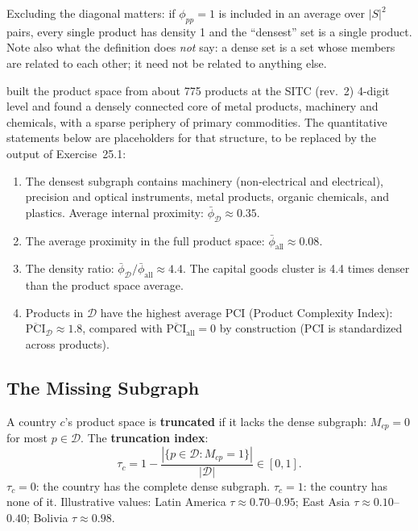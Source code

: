 \documentclass[../structural_economics_book.tex]{subfiles}
\begin{document}
Excluding the diagonal matters: if $\phi_{pp} = 1$ is included in an average over $|S|^2$ pairs, every single product has density 1 and the ``densest'' set is a single product. Note also what the definition does \emph{not} say: a dense set is a set whose members are related to each other; it need not be related to anything else.

\begin{stylizedfact}\label{ch25:prop:capital_goods}
\citet{hidalgo2007product} built the product space from about 775 products at the SITC (rev.~2) 4-digit level and found a densely connected core of metal products, machinery and chemicals, with a sparse periphery of primary commodities. The quantitative statements below are \illustrative{} placeholders for that structure, to be replaced by the output of Exercise~25.1:
\begin{enumerate}
\item The densest subgraph contains machinery (non-electrical and electrical), precision and optical instruments, metal products, organic chemicals, and plastics. Average internal proximity: $\bar{\phi}_{\mathcal{D}} \approx 0.35$.
\item The average proximity in the full product space: $\bar{\phi}_{\text{all}} \approx 0.08$.
\item The density ratio: $\bar{\phi}_{\mathcal{D}} / \bar{\phi}_{\text{all}} \approx 4.4$. The capital goods cluster is 4.4 times denser than the product space average.
\item Products in $\mathcal{D}$ have the highest average PCI (Product Complexity Index): $\overline{\text{PCI}}_{\mathcal{D}} \approx 1.8$, compared with $\overline{\text{PCI}}_{\text{all}} = 0$ by construction (PCI is standardized across products).
\end{enumerate}
\end{stylizedfact}


\subsection{The Missing Subgraph}

\begin{definition}\label{ch25:def:truncated}
A country $c$'s product space is \textbf{truncated} if it lacks the dense subgraph: $M_{cp} = 0$ for most $p \in \mathcal{D}$. The \textbf{truncation index}:
\begin{equation}\label{ch25:eq:truncation}
\tau_c = 1 - \frac{|\{p \in \mathcal{D} : M_{cp} = 1\}|}{|\mathcal{D}|} \in [0, 1].
\end{equation}
$\tau_c = 0$: the country has the complete dense subgraph. $\tau_c = 1$: the country has none of it. Illustrative values: Latin America $\tau \approx 0.70$--$0.95$; East Asia $\tau \approx 0.10$--$0.40$; Bolivia $\tau \approx 0.98$.
\end{definition}
\end{document}
